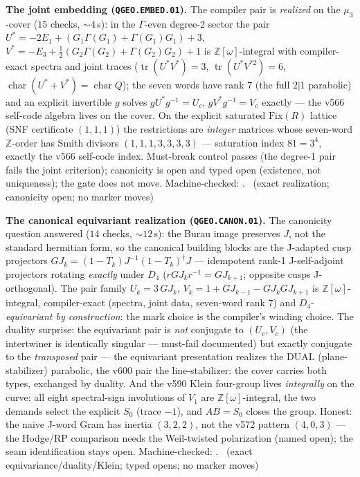 \par\smallskip\noindent\textbf{The joint embedding
(\texttt{QGEO.EMBED.01}).}
The compiler pair is \emph{realized} on the $\mu_3$-cover ($15$
checks, ${\sim}4$\,s): in the $\Gamma$-even degree-2 sector the pair
$U^*=-2E_1+(G_1\Gamma(G_1)+\Gamma(G_1)G_1)+3$,
$V^*=-E_3+\tfrac12(G_2\Gamma(G_2)+\Gamma(G_2)G_2)+1$ is
$\mathbb{Z}[\omega]$-integral with compiler-exact spectra and joint
traces ($\operatorname{tr}(U^*V^*)=3$,
$\operatorname{tr}(U^*V^{*2})=6$,
$\operatorname{char}(U^*{+}V^*)=\operatorname{char}Q$); the seven
words have rank $7$ (the full $2|1$ parabolic) and an explicit
invertible $g$ solves $gU^*g^{-1}=U_c$, $gV^*g^{-1}=V_c$ exactly ---
the v566 self-code algebra lives on the cover.  On the explicit
saturated $\mathrm{Fix}(R)$ lattice (SNF certificate $(1,1,1)$) the
restrictions are \emph{integer} matrices whose seven-word
$\mathbb{Z}$-order has Smith divisors $(1,1,1,3,3,3,3)$ ---
saturation index $81=3^4$, exactly the v566 self-code index.
Must-break control passes (the degree-1 pair fails the joint
criterion); canonicity is open and typed open (existence, not
uniqueness); the gate does not move.
Machine-checked: .
\mE\ (exact realization; canonicity open; no marker moves)
\par\smallskip

\par\smallskip\noindent\textbf{The canonical equivariant realization
(\texttt{QGEO.CANON.01}).}
The canonicity question answered ($14$ checks, ${\sim}12$\,s): the
Burau image preserves $J$, not the standard hermitian form, so the
canonical building blocks are the J-adapted cusp projectors
$GJ_k=(1-T_k)J^{-1}(1-T_k)^\dagger J$ --- idempotent rank-1
J-self-adjoint projectors rotating \emph{exactly} under $D_4$
($rGJ_kr^{-1}=GJ_{k+1}$; opposite cusps J-orthogonal).  The pair
family $U_k=3\,GJ_k$, $V_k=1+GJ_{k-1}-GJ_kGJ_{k+1}$ is
$\mathbb{Z}[\omega]$-integral, compiler-exact (spectra, joint data,
seven-word rank $7$) and $D_4$-\emph{equivariant by construction}:
the mark choice is the compiler's winding choice.  The duality
surprise: the equivariant pair is \emph{not} conjugate to
$(U_c,V_c)$ (the intertwiner is identically singular --- must-fail
documented) but exactly conjugate to the \emph{transposed} pair ---
the equivariant presentation realizes the DUAL (plane-stabilizer)
parabolic, the v600 pair the line-stabilizer: the cover carries both
types, exchanged by duality.  And the v590 Klein four-group lives
\emph{integrally} on the curve: all eight spectral-sign involutions
of $V_1$ are $\mathbb{Z}[\omega]$-integral, the two demands select
the explicit $S_0$ (trace $-1$), and $AB=S_0$ closes the group.
Honest: the naive J-word Gram has inertia $(3,2,2)$, not the v572
pattern $(4,0,3)$ --- the Hodge/RP comparison needs the Weil-twisted
polarization (named open); the seam identification stays open.
Machine-checked: .
\mE\ (exact equivariance/duality/Klein; typed opens; no marker moves)
\par\smallskip

